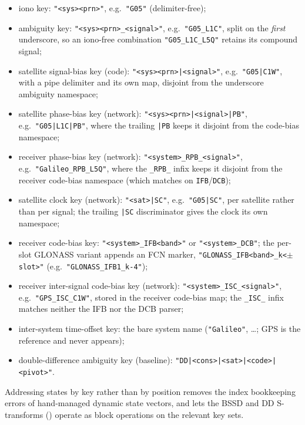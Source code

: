 \begin{itemize}[leftmargin=*, itemsep=0pt]
\item iono key: \texttt{"<sys><prn>"}, e.g.\ \texttt{"G05"} (delimiter-free);
\item ambiguity key: \texttt{"<sys><prn>\_<signal>"}, e.g.\ \texttt{"G05\_L1C"},
      split on the \emph{first} underscore, so an iono-free combination
      \texttt{"G05\_L1C\_L5Q"} retains its compound signal;
\item satellite signal-bias key (code): \texttt{"<sys><prn>|<signal>"},
      e.g.\ \texttt{"G05|C1W"}, with a pipe delimiter and its own map,
      disjoint from the underscore ambiguity namespace;
\item satellite phase-bias key (network): \texttt{"<sys><prn>|<signal>|PB"},
      e.g.\ \texttt{"G05|L1C|PB"}, where the trailing \texttt{|PB} keeps it
      disjoint from the code-bias namespace;
\item receiver phase-bias key (network): \texttt{"<system>\_RPB\_<signal>"},
      e.g.\ \texttt{"Galileo\_RPB\_L5Q"}, where the \texttt{\_RPB\_} infix keeps
      it disjoint from the receiver code-bias namespace (which matches on
      \texttt{IFB}/\texttt{DCB});
\item satellite clock key (network): \texttt{"<sat>|SC"}, e.g.\
      \texttt{"G05|SC"}, per satellite rather than per signal; the trailing
      \texttt{|SC} discriminator gives the clock its own namespace;
\item receiver code-bias key: \texttt{"<system>\_IFB<band>"} or
      \texttt{"<system>\_DCB"}; the per-slot GLONASS variant appends an
      FCN marker, \texttt{"GLONASS\_IFB<band>\_k<$\pm$slot>"} (e.g.\
      \texttt{"GLONASS\_IFB1\_k-4"});
\item receiver inter-signal code-bias key (network):
      \texttt{"<system>\_ISC\_<signal>"}, e.g.\ \texttt{"GPS\_ISC\_C1W"}, stored
      in the receiver code-bias map; the \texttt{\_ISC\_} infix matches neither
      the IFB nor the DCB parser;
\item inter-system time-offset key: the bare system name
      (\texttt{"Galileo"}, \dots; GPS is the reference and never appears);
\item double-difference ambiguity key (baseline):
      \texttt{"DD|<cons>|<sat>|<code>|<pivot>"}.
\end{itemize}
Addressing states by key rather than by position removes the index
bookkeeping errors of hand-managed dynamic state vectors, and lets the
BSSD and DD S-transforms (\Cref{sec:diff}) operate as block operations on
the relevant key sets.

